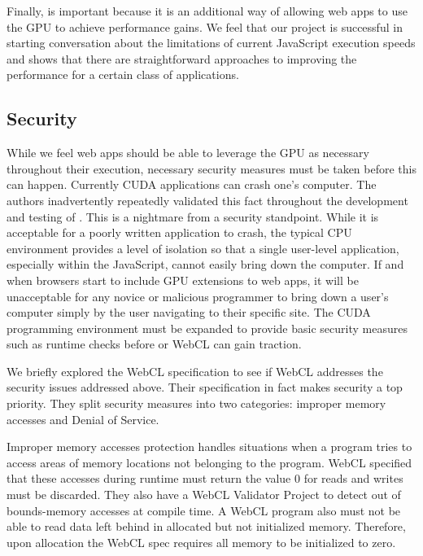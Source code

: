 Finally, \name is
important because it is an additional way of allowing web apps to use the GPU to
achieve performance gains. We feel that our project is successful in starting
conversation about the limitations of current JavaScript execution speeds and
shows that there are straightforward approaches to improving the performance for
a certain class of applications. 



\subsection{Security}
While we feel web apps should be able to leverage the GPU as necessary
throughout their execution, necessary security measures must be taken before
this can happen. Currently CUDA applications can crash one's computer. The
authors inadvertently repeatedly validated this fact throughout the development and
testing of \namens. This is a nightmare from a security standpoint. While it is
acceptable for a poorly written application to crash, the typical CPU
environment provides a level of isolation so that a single user-level
application, especially within the JavaScript, cannot easily bring down the
computer. If and when browsers start to include GPU extensions to web apps, it
will be unacceptable for any novice or malicious programmer to bring down a
user's computer simply by the user navigating to their specific site. The CUDA
programming environment must be expanded to provide basic security measures such
as runtime checks before \name or WebCL can gain traction.

We briefly explored the WebCL specification to see if WebCL addresses the
security issues addressed above. Their specification in fact makes security a
top priority. They split security measures into two categories: improper memory
accesses and Denial of Service.

Improper memory accesses protection handles situations when a program tries to
access areas of memory locations not belonging to the program. WebCL
specified that these accesses during runtime must return the value 0 for reads
and writes must be discarded. They also have a WebCL Validator Project
\cite{webclValidator} to detect out of bounds-memory accesses at compile time. A
WebCL program also must not be able to read data left behind in allocated but
not initialized memory. Therefore, upon allocation the WebCL spec requires all
memory to be initialized to zero.

